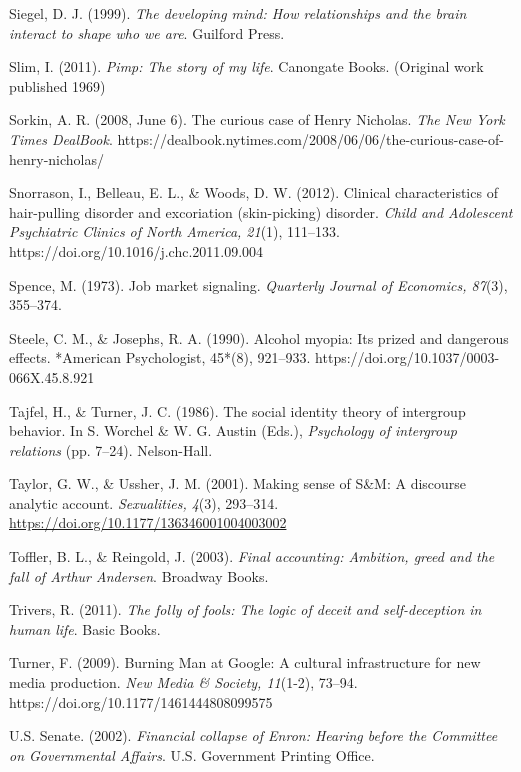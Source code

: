 \begin{thebibliography}{}
    Siegel, D. J. (1999). \textit{The developing mind: How relationships and the brain interact to shape who we are}. Guilford Press.

    Slim, I. (2011). \textit{Pimp: The story of my life}. Canongate Books. (Original work published 1969)

    Sorkin, A. R. (2008, June 6). The curious case of Henry Nicholas. \textit{The New York Times DealBook}. https://dealbook.nytimes.com/2008/06/06/the-curious-case-of-henry-nicholas/

    Snorrason, I., Belleau, E. L., \& Woods, D. W. (2012). Clinical characteristics of hair-pulling disorder and excoriation (skin-picking) disorder. \textit{Child and Adolescent Psychiatric Clinics of North America, 21}(1), 111–133. https://doi.org/10.1016/j.chc.2011.09.004

    Spence, M. (1973). Job market signaling. \textit{Quarterly Journal of Economics, 87}(3), 355–374.

    Steele, C. M., \& Josephs, R. A. (1990). Alcohol myopia: Its prized and dangerous effects. *American Psychologist, 45*(8), 921–933. https://doi.org/10.1037/0003-066X.45.8.921
    
    Tajfel, H., \& Turner, J. C. (1986). The social identity theory of intergroup behavior. In S. Worchel \& W. G. Austin (Eds.), \textit{Psychology of intergroup relations} (pp. 7–24). Nelson-Hall.

    Taylor, G. W., \& Ussher, J. M. (2001). Making sense of S\&M: A discourse analytic account. \textit{Sexualities, 4}(3), 293--314. \url{https://doi.org/10.1177/136346001004003002}

    Toffler, B. L., \& Reingold, J. (2003). \textit{Final accounting: Ambition, greed and the fall of Arthur Andersen}. Broadway Books.

    Trivers, R. (2011). \textit{The folly of fools: The logic of deceit and self-deception in human life}. Basic Books.

    Turner, F. (2009). Burning Man at Google: A cultural infrastructure for new media production. \textit{New Media \& Society, 11}(1-2), 73–94. https://doi.org/10.1177/1461444808099575

    U.S. Senate. (2002). \textit{Financial collapse of Enron: Hearing before the Committee on Governmental Affairs}. U.S. Government Printing Office.


\end{thebibliography}
